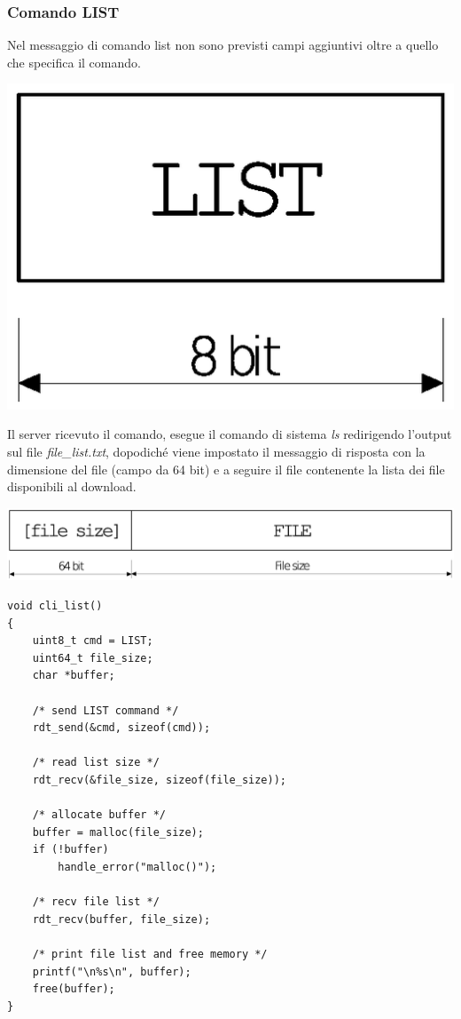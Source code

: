 \subsubsection{Comando LIST}

Nel messaggio di comando list non sono previsti campi aggiuntivi oltre a quello che specifica il comando.

\includegraphics[scale=0.35]{images/list_client}

Il server ricevuto il comando, esegue il comando di sistema \emph{ls} redirigendo l'output sul file \emph{file\_list.txt}, dopodiché viene impostato il messaggio di risposta con la dimensione del file (campo da 64 bit) e a seguire il file contenente la lista dei file disponibili al download.

\includegraphics[scale=0.35]{images/list_server}

\begin{lstlisting}[title=clicmd.c]
void cli_list()
{
    uint8_t cmd = LIST;
    uint64_t file_size;
    char *buffer;

    /* send LIST command */
    rdt_send(&cmd, sizeof(cmd));

    /* read list size */
    rdt_recv(&file_size, sizeof(file_size));

    /* allocate buffer */
    buffer = malloc(file_size);
    if (!buffer)
        handle_error("malloc()");

    /* recv file list */
    rdt_recv(buffer, file_size);

    /* print file list and free memory */
    printf("\n%s\n", buffer);
    free(buffer);
}                                                                
\end{lstlisting}

